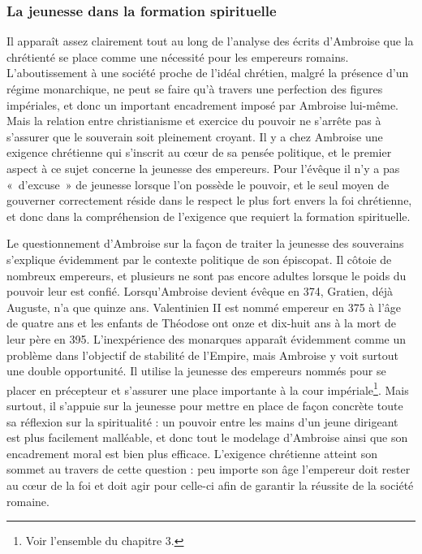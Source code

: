 \subsubsection{La jeunesse dans la formation spirituelle}

Il apparaît assez clairement tout au long de l'analyse des écrits d'Ambroise que la chrétienté se place comme une nécessité pour les empereurs romains. L'aboutissement à une société proche de l'idéal chrétien, malgré la présence d'un régime monarchique, ne peut se faire qu'à travers une perfection des figures impériales, et donc un important encadrement imposé par Ambroise lui-même. Mais la relation entre christianisme et exercice du pouvoir ne s'arrête pas à s'assurer que le souverain soit pleinement croyant. Il y a chez Ambroise une exigence chrétienne qui s'inscrit au cœur de sa pensée politique, et le premier aspect à ce sujet concerne la jeunesse des empereurs. Pour l'évêque il n'y a pas «~d'excuse~» de jeunesse lorsque l'on possède le pouvoir, et le seul moyen de gouverner correctement réside dans le respect le plus fort envers la foi chrétienne, et donc dans la compréhension de l'exigence que requiert la formation spirituelle.

\bigskip

Le questionnement d'Ambroise sur la façon de traiter la jeunesse des souverains s'explique évidemment par le contexte politique de son épiscopat. Il côtoie de nombreux empereurs, et plusieurs ne sont pas encore adultes lorsque le poids du pouvoir leur est confié. Lorsqu'Ambroise devient évêque en 374, Gratien, déjà Auguste, n'a que quinze ans. Valentinien II est nommé empereur en 375 à l'âge de quatre ans et les enfants de Théodose ont onze et dix-huit ans à la mort de leur père en 395. L'inexpérience des monarques apparaît évidemment comme un problème dans l'objectif de stabilité de l'Empire, mais Ambroise y voit surtout une double opportunité. Il utilise la jeunesse des empereurs nommés pour se placer en précepteur et s'assurer une place importante à la cour impériale\footnote{Voir l'ensemble du chapitre 3.}. Mais surtout, il s'appuie sur la jeunesse pour mettre en place de façon concrète toute sa réflexion sur la spiritualité : un pouvoir entre les mains d'un jeune dirigeant est plus facilement malléable, et donc tout le modelage d'Ambroise ainsi que son encadrement moral est bien plus efficace. L'exigence chrétienne atteint son sommet au travers de cette question : peu importe son âge l'empereur doit rester au cœur de la foi et doit agir pour celle-ci afin de garantir la réussite de la société romaine.

